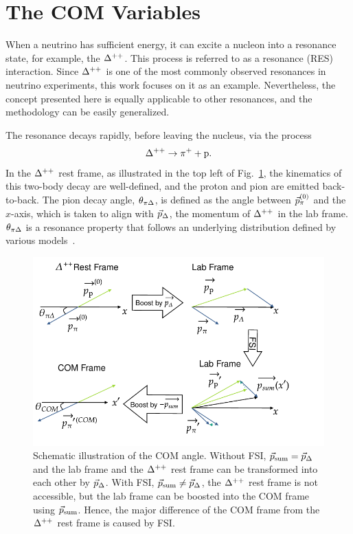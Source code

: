 \section{The COM Variables}
\label{sec:mc-com}
When a neutrino has sufficient energy, it can excite a nucleon into a resonance state, for example, the $\Delta^{++}$. 
This process is referred to as a resonance (RES) interaction.
Since $\Delta^{++}$ is one of the most commonly observed resonances in neutrino experiments, this work focuses on it as an example.
Nevertheless, the concept presented here is equally applicable to other resonances, and the methodology can be easily generalized.

The resonance decays rapidly, before leaving the nucleus, via the process
\begin{equation}
     \Delta^{++} \rightarrow \pi^+ + \textrm{p}.
\end{equation}
In the $\Delta^{++}$ rest frame, as illustrated in the top left of Fig.~\ref{fig:COM-diagram}, the kinematics of this two-body decay are well-defined, and the proton and pion are emitted back-to-back.
The pion decay angle, $\theta_{\pi\Delta}$, is defined as the angle between $\vec{p}_{\pi}^{(0)}$ and the $x$-axis, which is taken to align with $\vec{p}_{\Delta}$, the momentum of $\Delta^{++}$ in the lab frame. 
$\theta_{\pi\Delta}$ is a resonance property that follows an underlying distribution defined by various models~\cite{Rein:1987cb,Kabirnezhad:2017jmf,Kabirnezhad:2020wtp,Kabirnezhad:2022znc}.

\begin{figure}[ht!]
\centering
\includegraphics[width=\linewidth]{figures/COM/COM-diagram.pdf}
\caption{Schematic illustration of the COM angle. Without FSI, $\vec{p}_{\textrm{sum}}=\vec{p}_{\Delta}$ and the lab frame and the $\Delta^{++}$ rest frame can be transformed into each other by $\vec{p}_{\Delta}$. With FSI, $\vec{p}_{\textrm{sum}} \neq \vec{p}_{\Delta}$, the $\Delta^{++}$ rest frame is not accessible, but the lab frame can be boosted into the COM frame using $\vec{p}_{\textrm{sum}}$. Hence, the major difference of the COM frame from the $\Delta^{++}$ rest frame is caused by FSI.}
\label{fig:COM-diagram}
\end{figure}

